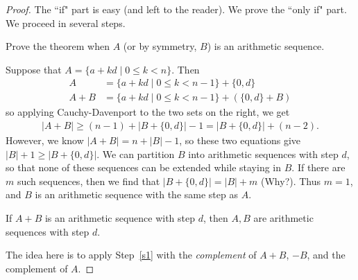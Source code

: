 \begin{proof}
The ``if" part is easy (and left to the reader). We prove the ``only if" part. We proceed in several steps.
\begin{st}\label{s1}
Prove the theorem when $A$ (or by symmetry, $B$) is an arithmetic sequence.
\end{st}
Suppose that $A=\{a+kd\mid 0\leq k<n\}$. Then 
\begin{align*}
A&=\{a+kd\mid 0\leq k<n-1\}+\{0,d\}\\
A+B&=\{a+kd\mid 0\leq k<n-1\}+(\{0,d\}+B)
\end{align*}
so applying Cauchy-Davenport to the two sets on the right, we get
\begin{align*}
|A+B|\geq (n-1)+|B+\{0,d\}|-1=|B+\{0,d\}|+(n-2).
\end{align*}
However, we know $|A+B|=n+|B|-1$, so these two equations give $|B|+1\geq |B+\{0,d\}|$. We can partition $B$ into arithmetic sequences with step $d$, so that none of these sequences can be extended while staying in $B$. If there are $m$ such sequences, then we find that $|B+\{0,d\}|=|B|+m$ (Why?). Thus $m=1$, and $B$ is an arithmetic sequence with the same step as $A$.

\begin{st}\label{s2}
If $A+B$ is an arithmetic sequence with step $d$, then $A,B$ are arithmetic sequences with step $d$.
\end{st}
The idea here is to apply Step~\ref{s1} with the {\it complement} of $A+B$, $-B$, and the complement of $A$.


\end{proof}
